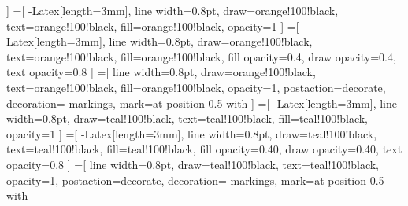                 ]
                =[
                    -{Latex[length=3mm]},
                    line width=0.8pt,
                    draw=orange!100!black,
                    text=orange!100!black,
                    fill=orange!100!black,
                    opacity=1
                ]
                =[
                    -{Latex[length=3mm]},
                    line width=0.8pt,
                    draw=orange!100!black,
                    text=orange!100!black,
                    fill=orange!100!black,
                    fill opacity=0.4,
                    draw opacity=0.4,
                    text opacity=0.8
                ]
                =[
                   line width=0.8pt,
                    draw=orange!100!black,
                    text=orange!100!black,
                    fill=orange!100!black,
                    opacity=1,
                    postaction={decorate},
                    decoration={
                        markings,
                        mark=at position 0.5 with {\gecentreerdepijl[3mm]}
                    }
                ]                
                =[
                    -{Latex[length=3mm]},
                    line width=0.8pt,
                    draw=teal!100!black,
                    text=teal!100!black,
                    fill=teal!100!black,
                    opacity=1
                ]
                =[
                    -{Latex[length=3mm]},
                    line width=0.8pt,
                    draw=teal!100!black,
                    text=teal!100!black,
                    fill=teal!100!black,
                    fill opacity=0.40,
                    draw opacity=0.40,
                    text opacity=0.8
                ]
                =[
                   line width=0.8pt,
                    draw=teal!100!black,
                    text=teal!100!black,
                    opacity=1,
                    postaction={decorate},
                    decoration={
                        markings,
                        mark=at position 0.5 with {\gecentreerdepijl[3mm]}
                    }
